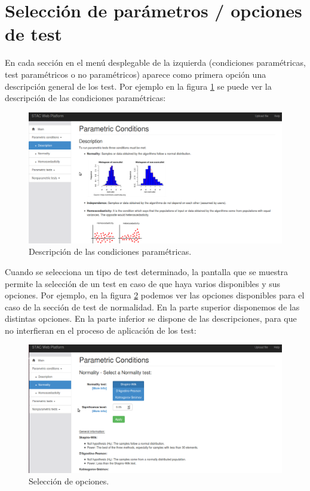 \section{Selección de parámetros / opciones de test}

En cada sección en el menú desplegable de la izquierda (condiciones paramétricas, test paramétricos o no paramétricos) aparece como primera opción una descripción general de los test. Por ejemplo en la figura \ref{fig:man_descripcion} se puede ver la descripción de las condiciones paramétricas:

\begin{figure}[H]
\centering
\includegraphics[scale=0.4]{figuras/man_descripcion.png}
\caption{Descripción de las condiciones paramétricas.}
\label{fig:man_descripcion}
\end{figure}

Cuando se selecciona un tipo de test determinado, la pantalla que se muestra permite la selección de un test en caso de que haya varios disponibles y sus opciones. Por ejemplo, en la figura \ref{fig:man_opciones} podemos ver las opciones disponibles para el caso de la sección de test de normalidad. En la parte superior disponemos de las distintas opciones. En la parte inferior se dispone de las descripciones, para que no interfieran en el proceso de aplicación de los test:

\begin{figure}[H]
\centering
\includegraphics[scale=0.4]{figuras/man_opciones.png}
\caption{Selección de opciones.}
\label{fig:man_opciones}
\end{figure}

